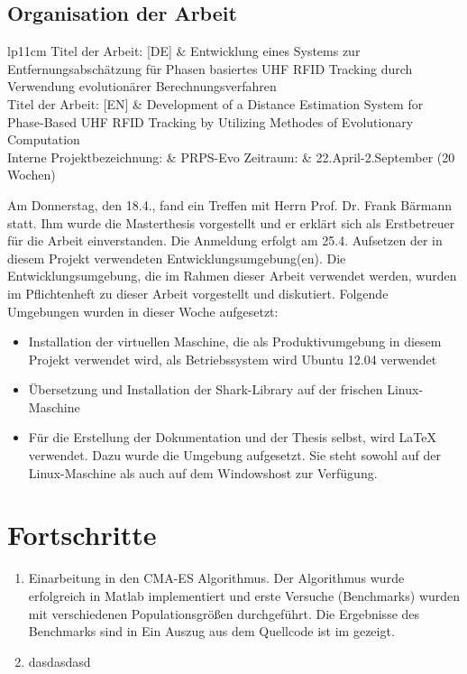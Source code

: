 \documentclass[a4paper,12pt,fleqn]{scrartcl}
\begin{document}
\subsection{Organisation der Arbeit}
\begin{table}[right]
    \renewcommand{\arraystretch}{1.5}
    \begin{tabular}{lp{11cm}}
      Titel der Arbeit:  [DE]		&	Entwicklung eines Systems zur
Entfernungsabschätzung für Phasen basiertes
      UHF RFID Tracking durch Verwendung evolutionärer Berechnungsverfahren \\
      Titel der Arbeit:  [EN]		&	Development of a Distance
Estimation System for Phase-Based UHF RFID
      Tracking by Utilizing Methodes of Evolutionary Computation \\
      Interne Projektbezeichnung:	&	PRPS-Evo
      Zeitraum:				&	22.April-2.September (20 Wochen)
\\
    \end{tabular}
\end{table}
%
Am Donnerstag, den 18.4., fand ein Treffen mit Herrn Prof.
Dr. Frank Bärmann statt. Ihm wurde die Masterthesis vorgestellt und er erklärt
sich als Erstbetreuer für die Arbeit einverstanden.
\newline
%
Die Anmeldung erfolgt am 25.4.
\newline
%
Aufsetzen der in diesem Projekt verwendeten Entwicklungsumgebung(en). Die
Entwicklungsumgebung, die im Rahmen dieser Arbeit verwendet werden, wurden im
Pflichtenheft zu dieser Arbeit vorgestellt und diskutiert.
\newline
%
Folgende Umgebungen wurden in dieser Woche aufgesetzt:
\begin{itemize}
  \item Installation der virtuellen Maschine, die als Produktivumgebung in
diesem
Projekt verwendet wird, als Betriebssystem wird Ubuntu 12.04 verwendet
  \item Übersetzung und Installation der Shark-Library auf der frischen
  Linux-Maschine
  \item Für die Erstellung der Dokumentation und der Thesis selbst, wird
\LaTeX{} verwendet.
  Dazu wurde die Umgebung aufgesetzt. Sie steht sowohl auf der Linux-Maschine
als auch auf dem Windowshost zur Verfügung.
\end{itemize}

\section[Fortschritte]{Fortschritte}
\begin{enumerate}
 \item Einarbeitung in den CMA-ES Algorithmus. Der Algorithmus wurde erfolgreich
in Matlab
      implementiert und erste Versuche (Benchmarks) wurden mit verschiedenen
Populationsgrößen durchgeführt. Die Ergebnisse des Benchmarks sind in
      Ein Auszug aus dem Quellcode ist im  gezeigt.
 \item
        dasdasdasd
\end{enumerate}
\end{document}
